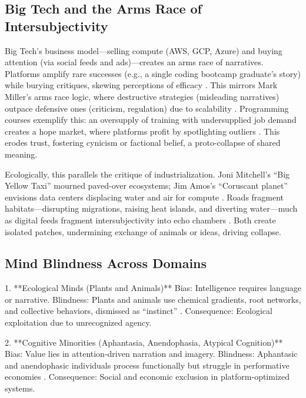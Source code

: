 \documentclass{article}
\begin{document}
\subsection{Big Tech and the Arms Race of Intersubjectivity}
Big Tech’s business model—selling compute (AWS, GCP, Azure) and buying attention (via social feeds and ads)—creates an arms race of narratives. Platforms amplify rare successes (e.g., a single coding bootcamp graduate’s story) while burying critiques, skewing perceptions of efficacy \citep{zuboff2019age, wu2016attention}. This mirrors Mark Miller’s arms race logic, where destructive strategies (misleading narratives) outpace defensive ones (criticism, regulation) due to scalability \citep{miller1988markets}. Programming courses exemplify this: an oversupply of training with undersupplied job demand creates a hope market, where platforms profit by spotlighting outliers \citep{carr2010shallows}. This erodes trust, fostering cynicism or factional belief, a proto-collapse of shared meaning.

Ecologically, this parallels the critique of industrialization. Joni Mitchell’s “Big Yellow Taxi” mourned paved-over ecosystems; Jim Amos’s “Coruscant planet” envisions data centers displacing water and air for compute \citep{lanham2006economics}. Roads fragment habitats—disrupting migrations, raising heat islands, and diverting water—much as digital feeds fragment intersubjectivity into echo chambers \citep{arendt1958human}. Both create isolated patches, undermining exchange of animals or ideas, driving collapse.

\subsection{Mind Blindness Across Domains}
1. **Ecological Minds (Plants and Animals)**  
   Bias: Intelligence requires language or narrative.  
   Blindness: Plants and animals use chemical gradients, root networks, and collective behaviors, dismissed as “instinct” \citep{gieling2011assessing, mendell2010why}.  
   Consequence: Ecological exploitation due to unrecognized agency.

2. **Cognitive Minorities (Aphantasia, Anendophasia, Atypical Cognition)**  
   Bias: Value lies in attention-driven narration and imagery.  
   Blindness: Aphantasic and anendophasic individuals process functionally but struggle in performative economies \citep{zeman2015, hurlburt2024}.  
   Consequence: Social and economic exclusion in platform-optimized systems.
\end{document}
